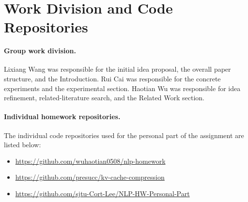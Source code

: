 \documentclass{article}
\begin{document}
\appendix

\section{Work Division and Code Repositories}
\label{app:work-division}

\paragraph{Group work division.}
Lixiang Wang was responsible for the initial idea proposal, the overall paper
structure, and the Introduction. Rui Cai was responsible for the concrete
experiments and the experimental section. Haotian Wu was responsible for idea
refinement, related-literature search, and the Related Work section.

\paragraph{Individual homework repositories.}
The individual code repositories used for the personal part of the assignment
are listed below:
\begin{itemize}
  \item \url{https://github.com/wuhaotian0508/nlp-homework}
  \item \url{https://github.com/presucc/kv-cache-compression}
  \item \url{https://github.com/sjtu-Cort-Lee/NLP-HW-Personal-Part}
\end{itemize}
\end{document}
